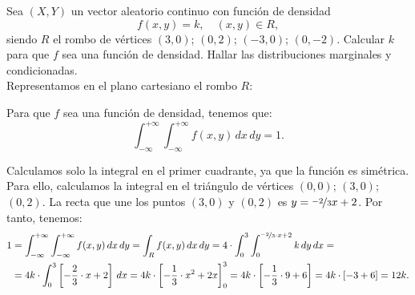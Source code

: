 \begin{ejercicio}
    Sea $(X,Y)$ un vector aleatorio continuo con función de densidad
    \[
        f(x, y) = k, \quad (x, y) \in R,
    \]
    siendo $R$ el rombo de vértices $(3,0)$; $(0,2)$; $(-3,0)$; $(0,-2)$. Calcular $k$ para que $f$ sea una función de densidad. Hallar las distribuciones marginales y condicionadas.\\

    Representamos en el plano cartesiano el rombo $R$:
    \begin{figure}[H]
        \centering
    \end{figure}

    Para que $f$ sea una función de densidad, tenemos que:
    \begin{equation*}
        \int_{-\infty}^{+\infty} \int_{-\infty}^{+\infty} f(x, y) \, dx \, dy = 1.
    \end{equation*}

    Calculamos solo la integral en el primer cuadrante, ya que la función es simétrica. Para ello, calculamos la integral en el triángulo de vértices $(0,0)$; $(3,0)$; $(0,2)$. La recta que une los puntos $(3,0)$ y $(0,2)$ es $y=\nicefrac{-2}{3}x+2$. Por tanto, tenemos:
    \begin{align*}
        1&=\int_{-\infty}^{+\infty} \int_{-\infty}^{+\infty} f(x, y) \, dx \, dy
        = \int_R f(x, y) \, dx \, dy = 4\cdot \int_{0}^{3} \int_{0}^{\nicefrac{-2}{3}\cdot x+2} k \, dy \, dx =\\&= 4k\cdot \int_{0}^{3} \left[-\frac{2}{3}\cdot x+2\right] \, dx = 4k\cdot \left[-\frac{1}{3}\cdot x^2+2x\right]_0^3 = 4k\cdot \left[-\frac{1}{3}\cdot 9+6\right] = 4k\cdot \left[-3+6\right] = 12k.
    \end{align*}


\end{ejercicio}
